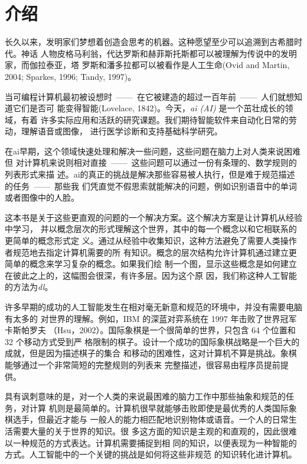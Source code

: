 
\chapter{介绍}
\label{ch:intro}

长久以来，发明家们梦想着创造会思考的机器。这种愿望至少可以追溯到古希腊时代。神话
人物皮格马利翁，代达罗斯和赫菲斯托斯都可以被理解为传说中的发明家，而伽拉泰亚，塔
罗斯和潘多拉都可以被看作是人工生命(Ovid and Martin, 2004; Sparkes, 1996; Tandy,
1997)。

当可编程计算机最初被设想时~——~在它被建造的超过一百年前~——~人们就想知道它们是否可
能变得智能(Lovelace, 1842)。今天，\emph{\gls{ai} (AI)} 是一个茁壮成长的领域，有着
许多实际应用和活跃的研究课题。我们期待智能软件来自动化日常的劳动，理解语音或图像，
进行医学诊断和支持基础科学研究。

在\gls*{ai}早期，这个领域快速处理和解决一些问题，这些问题在脑力上对人类来说困难但
对计算机来说则相对直接~——~这些问题可以通过一份有条理的、数学规则的列表形式来描
述。\gls*{ai}的真正的挑战是解决那些容易被人执行，但是难于规范描述的任务~——~那些我
们凭直觉不假思索就能解决的问题，例如识别语音中的单词或者图像中的人脸。

这本书是关于这些更直观的问题的一个解决方案。这个解决方案是让计算机从经验中学习，
并以概念层次的形式理解这个世界，其中的每一个概念以和它相联系的更简单的概念形式定
义。通过从经验中收集知识，这种方法避免了需要人类操作者规范地去指定计算机需要的所
有知识。概念的层次结构允许计算机通过建立更简单的概念来学习复杂的概念。如果我们绘
制一个图，显示这些概念是如何建立在彼此之上的，这幅图会很深，有许多层。因为这个原
因，我们称这种人工智能的方法为\emph{\gls{dl}}。

许多早期的成功的人工智能发生在相对毫无新意和规范的环境中，并没有需要电脑有太多的
对世界的理解。例如，IBM 的深蓝对弈系统在 1997 年击败了世界冠军卡斯帕罗夫
（Hsu，2002）。国际象棋是一个很简单的世界，只包含 64 个位置和 32 个移动方式受到严
格限制的棋子。设计一个成功的国际象棋战略是一个巨大的成就，但是因为描述棋子的集合
和移动的困难性，这对计算机不算是挑战。象棋能够通过一个非常简短的完整规则的列表来
完整描述，很容易由程序员提前提供。

具有讽刺意味的是，对一个人类的来说最困难的脑力工作中那些抽象和规范的任务，对计算
机则是最简单的。计算机很早就能够击败即使是最优秀的人类国际象棋选手，但最近才能与
一般人的能力相匹配地识别物体或语音。一个人的日常生活需要大量的关于世界的知识。很
多这方面的知识是主观的和直观的，因此很难以一种规范的方式表达。计算机需要捕捉到相
同的知识，以便表现为一种智能的方式。人工智能中的一个关键的挑战是如何将这些非规范
的知识转化进计算机。

